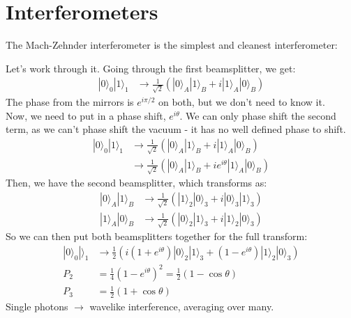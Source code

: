 \documentclass[a4paper, 11pt, normalem]{report}
\begin{document}
\section{Interferometers}
The Mach-Zehnder interferometer is the simplest and cleanest interferometer:
\begin{figure}[H]
    \centering
\end{figure}
Let's work through it. 
Going through the first beamsplitter, we get:
\begin{align}
    |0\rangle_0|1\rangle_1 &\to \frac{1}{\sqrt{2}}\left(|0\rangle_A|1\rangle_B + i|1\rangle_A|0\rangle_B\right)
\end{align}
The phase from the mirrors is $e^{i\pi/2}$ on both, but we don't need to know it. \\
Now, we need to put in a phase shift, $e^{i\theta}$. 
We can only phase shift the second term, as we can't phase shift the vacuum - it has no well defined phase to shift. 
\begin{align}
    |0\rangle_0|1\rangle_1 &\to \frac{1}{\sqrt{2}}\left(|0\rangle_A|1\rangle_B + i|1\rangle_A|0\rangle_B\right)\\
                           &\to \frac{1}{\sqrt{2}}\left(|0\rangle_A|1\rangle_B + ie^{i\theta}|1\rangle_A|0\rangle_B\right)
\end{align}
Then, we have the second beamsplitter, which transforms as:
\begin{align}
    |0\rangle_A|1\rangle_B &\to \frac{1}{\sqrt{2}}\left(|1\rangle_2|0\rangle_3 + i|0\rangle_3|1\rangle_3\right) \\
    |1\rangle_A|0\rangle_B &\to \frac{1}{\sqrt{2}}\left(|0\rangle_2|1\rangle_3 + i|1\rangle_2|0\rangle_3\right) 
\end{align}
So we can then put both beamsplitters together for the full transform:
\begin{align}
    |0\rangle_0|\rangle_1 &\to \frac12 \left(i(1+e^{i\theta})|0\rangle_2|1\rangle_3 + (1-e^{i\theta})|1\rangle_2|0\rangle_3\right) \\
    P_2 &= \frac14(1-e^{i\theta})^2 = \frac12 (1-\cos\theta) \\
    P_3 &= \frac12(1+\cos\theta)
\end{align}
Single photons $\to$ wavelike interference, averaging over many. 
\end{document}
